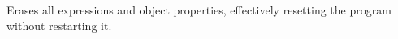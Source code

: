 
Erases all expressions and object properties, effectively resetting
the program without restarting it.


